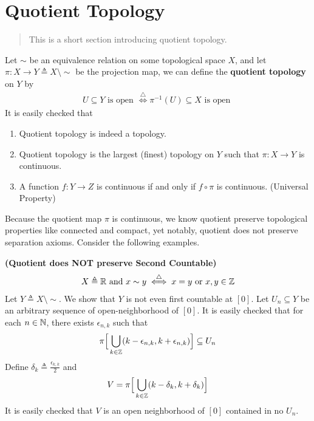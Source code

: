 \documentclass{report}
\begin{document}
\section{Quotient Topology}
\begin{abstract}
  This is a short section introducing quotient topology. 
\end{abstract}
\begin{mdframed}
Let $\sim $ be an equivalence relation on some topological space $X$, and let $\pi:X\rightarrow Y\triangleq X\setminus \sim$ be the projection map, we can define the \textbf{quotient topology} on $Y$ by  
\begin{align*}
U\subseteq Y\text{ is open }\overset{\triangle}{\iff }\pi^{-1}(U)\subseteq X\text{ is open }
\end{align*}
It is easily checked that 
\begin{enumerate}[label=(\alph*)]
\label{quotient property}
  \item Quotient topology is indeed a topology.  
  \item Quotient topology is the largest (finest) topology on $Y$ such that $\pi:X\rightarrow Y$ is continuous. 
  \item A function $f:Y\rightarrow Z$ is continuous if and only if $f\circ \pi$ is continuous. (Universal Property)
\end{enumerate}
Because the quotient map  $\pi$ is continuous, we know quotient preserve topological properties like connected and compact, yet notably, quotient does not preserve separation axioms. Consider the following examples.
\end{mdframed}
\begin{Example}{\textbf{(Quotient does NOT preserve Second Countable)}}{}
\begin{align*}
X\triangleq \mathbb{R}\text{ and }x\sim y \overset{\triangle}{\iff }x=y\text{ or }x,y\in\mathbb{Z}
\end{align*}
Let $Y\triangleq X\setminus \sim $. We show that $Y$ is not even first countable at $[0]$. Let $U_n\subseteq Y$ be an arbitrary sequence of open-neighborhood of $[0]$. It is easily checked that for each $n\in\mathbb{N}$, there exists $\epsilon _{n,k}$ such that 
\begin{align*}
\pi \Big[ \bigcup_{k\in\mathbb{Z}} (k-\epsilon_{n,k},k+\epsilon_{n,k}) \Big] \subseteq U_n
\end{align*}
Define $\delta_k\triangleq \frac{\epsilon_{k,k}}{2}$ and 
\begin{align*}
V=\pi \Big[\bigcup_{k\in\mathbb{Z}} (k-\delta_k,k+\delta_k) \Big] 
\end{align*}
It is easily checked that $V$ is an open neighborhood of  $[0]$ contained in no $U_n$.
\end{Example}
\end{document}
